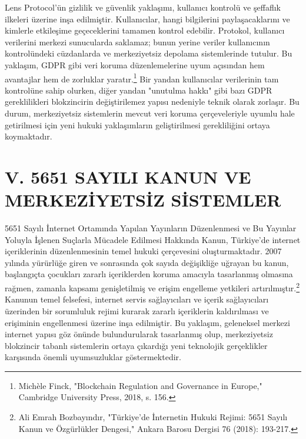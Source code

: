 \documentclass[11pt,a4paper]{article}
\begin{document}
Lens Protocol'ün gizlilik ve güvenlik yaklaşımı, kullanıcı kontrolü ve şeffaflık ilkeleri üzerine inşa edilmiştir. Kullanıcılar, hangi bilgilerini paylaşacaklarını ve kimlerle etkileşime geçeceklerini tamamen kontrol edebilir. Protokol, kullanıcı verilerini merkezi sunucularda saklamaz; bunun yerine veriler kullanıcının kontrolündeki cüzdanlarda ve merkeziyetsiz depolama sistemlerinde tutulur. Bu yaklaşım, GDPR gibi veri koruma düzenlemelerine uyum açısından hem avantajlar hem de zorluklar yaratır.\footnote{Michèle Finck, "Blockchain Regulation and Governance in Europe," Cambridge University Press, 2018, s. 156.} Bir yandan kullanıcılar verilerinin tam kontrolüne sahip olurken, diğer yandan "unutulma hakkı" gibi bazı GDPR gereklilikleri blokzincirin değiştirilemez yapısı nedeniyle teknik olarak zorlaşır. Bu durum, merkeziyetsiz sistemlerin mevcut veri koruma çerçeveleriyle uyumlu hale getirilmesi için yeni hukuki yaklaşımların geliştirilmesi gerekliliğini ortaya koymaktadır.

\section*{\fontsize{12}{14}\selectfont\bfseries V. 5651 SAYILI KANUN VE MERKEZİYETSİZ SİSTEMLER}

5651 Sayılı İnternet Ortamında Yapılan Yayınların Düzenlenmesi ve Bu Yayınlar Yoluyla İşlenen Suçlarla Mücadele Edilmesi Hakkında Kanun, Türkiye'de internet içeriklerinin düzenlenmesinin temel hukuki çerçevesini oluşturmaktadır. 2007 yılında yürürlüğe giren ve sonrasında çok sayıda değişikliğe uğrayan bu kanun, başlangıçta çocukları zararlı içeriklerden koruma amacıyla tasarlanmış olmasına rağmen, zamanla kapsamı genişletilmiş ve erişim engelleme yetkileri artırılmıştır.\footnote{Ali Emrah Bozbayındır, "Türkiye'de İnternetin Hukuki Rejimi: 5651 Sayılı Kanun ve Özgürlükler Dengesi," Ankara Barosu Dergisi 76 (2018): 193-217.} Kanunun temel felsefesi, internet servis sağlayıcıları ve içerik sağlayıcıları üzerinden bir sorumluluk rejimi kurarak zararlı içeriklerin kaldırılması ve erişiminin engellenmesi üzerine inşa edilmiştir. Bu yaklaşım, geleneksel merkezi internet yapısı göz önünde bulundurularak tasarlanmış olup, merkeziyetsiz blokzincir tabanlı sistemlerin ortaya çıkardığı yeni teknolojik gerçeklikler karşısında önemli uyumsuzluklar göstermektedir.
\end{document}
